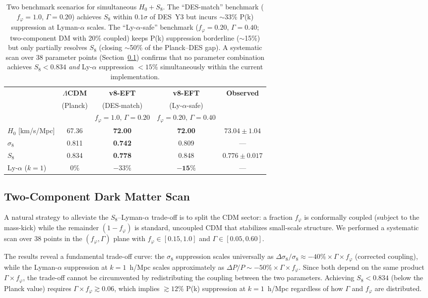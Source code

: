 \documentclass[a4paper,11pt]{article}
\newcommand{\LCDM}{$\Lambda$CDM}
\newcommand{\fphi}{f_\varphi}
\begin{document}
\begin{table}[h!]
\centering
\begin{tabular}{lcccc}
\toprule
& \textbf{\LCDM} & \textbf{v8-EFT} & \textbf{v8-EFT} & \textbf{Observed} \\
& (Planck) & (DES-match) & (Ly-$\alpha$-safe) & \\
& & $\fphi\!=\!1.0,\,\Gamma\!=\!0.20$ & $\fphi\!=\!0.20,\,\Gamma\!=\!0.40$ & \\
\midrule
$H_0$ [km/s/Mpc] & 67.36 & \textbf{72.00} & \textbf{72.00} & $73.04 \pm 1.04$ \\
$\sigma_8$ & 0.811 & \textbf{0.742} & 0.809 & --- \\
$S_8$ & 0.834 & \textbf{0.778} & 0.848 & $0.776 \pm 0.017$ \\
Ly-$\alpha$ ($k\!=\!1$) & 0\% & $-33\%$ & $\mathbf{-15\%}$ & --- \\
\bottomrule
\end{tabular}
\caption{Two benchmark scenarios for simultaneous $H_0 + S_8$. The ``DES-match'' benchmark ($\fphi = 1.0$, $\Gamma = 0.20$) achieves $S_8$ within $0.1\sigma$ of DES~Y3 but incurs $\sim$33\% P(k) suppression at Lyman-$\alpha$ scales. The ``Ly-$\alpha$-safe'' benchmark ($\fphi = 0.20$, $\Gamma = 0.40$; two-component DM with 20\% coupled) keeps P(k) suppression borderline ($\sim$15\%) but only partially resolves $S_8$ (closing $\sim$50\% of the Planck--DES gap). A systematic scan over 38 parameter points (Section~\ref{sec:twocomp}) confirms that no parameter combination achieves $S_8 < 0.834$ \textit{and} Ly-$\alpha$ suppression $< 15\%$ simultaneously within the current implementation.}
\label{tab:summary_tensions}
\end{table}

\subsection{Two-Component Dark Matter Scan}
\label{sec:twocomp}

A natural strategy to alleviate the $S_8$--Lyman-$\alpha$ trade-off is to split the CDM sector: a fraction $\fphi$ is conformally coupled (subject to the mass-kick) while the remainder $(1-\fphi)$ is standard, uncoupled CDM that stabilizes small-scale structure. We performed a systematic scan over 38 points in the $(\fphi, \Gamma)$ plane with $\fphi \in [0.15, 1.0]$ and $\Gamma \in [0.05, 0.60]$.

The results reveal a fundamental trade-off curve: the $\sigma_8$ suppression scales universally as $\Delta\sigma_8/\sigma_8 \approx -40\% \times \Gamma \times \fphi$ (corrected coupling), while the Lyman-$\alpha$ suppression at $k = 1$~h/Mpc scales approximately as $\Delta P/P \sim -50\% \times \Gamma \times \fphi$. Since both depend on the same product $\Gamma \times \fphi$, the trade-off cannot be circumvented by redistributing the coupling between the two parameters. Achieving $S_8 < 0.834$ (below the Planck value) requires $\Gamma \times \fphi \gtrsim 0.06$, which implies $\gtrsim 12\%$ P(k) suppression at $k = 1$~h/Mpc regardless of how $\Gamma$ and $\fphi$ are distributed.
\end{document}

